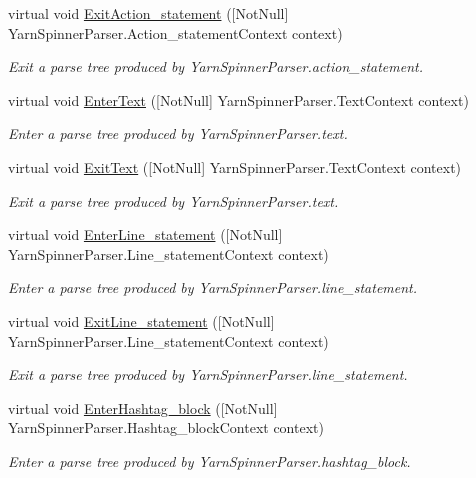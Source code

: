 \begin{DoxyCompactItemize}
virtual void \hyperlink{a00190_ad2dccfeea09bb2b5cdcd244833b9f584}{Exit\-Action\-\_\-statement} (\mbox{[}Not\-Null\mbox{]} Yarn\-Spinner\-Parser.\-Action\-\_\-statement\-Context context)
\begin{DoxyCompactList}\small\item\em Exit a parse tree produced by Yarn\-Spinner\-Parser.\-action\-\_\-statement. \end{DoxyCompactList}\item 
virtual void \hyperlink{a00190_acc7ee2d7db98a4fb7401ceef15333752}{Enter\-Text} (\mbox{[}Not\-Null\mbox{]} Yarn\-Spinner\-Parser.\-Text\-Context context)
\begin{DoxyCompactList}\small\item\em Enter a parse tree produced by Yarn\-Spinner\-Parser.\-text. \end{DoxyCompactList}\item 
virtual void \hyperlink{a00190_a8d4b310bdc6b8f2d48c6885ca52e35d2}{Exit\-Text} (\mbox{[}Not\-Null\mbox{]} Yarn\-Spinner\-Parser.\-Text\-Context context)
\begin{DoxyCompactList}\small\item\em Exit a parse tree produced by Yarn\-Spinner\-Parser.\-text. \end{DoxyCompactList}\item 
virtual void \hyperlink{a00190_af47d3ec045f331f2f6eb172e3954d504}{Enter\-Line\-\_\-statement} (\mbox{[}Not\-Null\mbox{]} Yarn\-Spinner\-Parser.\-Line\-\_\-statement\-Context context)
\begin{DoxyCompactList}\small\item\em Enter a parse tree produced by Yarn\-Spinner\-Parser.\-line\-\_\-statement. \end{DoxyCompactList}\item 
virtual void \hyperlink{a00190_adb3ac6b0a7f40d2f4cf5fcfe84b83eb3}{Exit\-Line\-\_\-statement} (\mbox{[}Not\-Null\mbox{]} Yarn\-Spinner\-Parser.\-Line\-\_\-statement\-Context context)
\begin{DoxyCompactList}\small\item\em Exit a parse tree produced by Yarn\-Spinner\-Parser.\-line\-\_\-statement. \end{DoxyCompactList}\item 
virtual void \hyperlink{a00190_a9ff2355e87f3be1cf750074e9298c3ae}{Enter\-Hashtag\-\_\-block} (\mbox{[}Not\-Null\mbox{]} Yarn\-Spinner\-Parser.\-Hashtag\-\_\-block\-Context context)
\begin{DoxyCompactList}\small\item\em Enter a parse tree produced by Yarn\-Spinner\-Parser.\-hashtag\-\_\-block. \end{DoxyCompactList}\item 

\end{DoxyCompactItemize}

